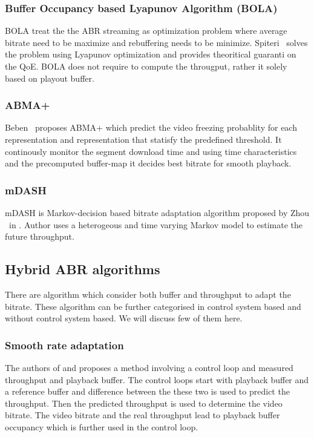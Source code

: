 \subsubsection{Buffer Occupancy based Lyapunov Algorithm (BOLA)\cite{7524428}}
BOLA\cite{7524428} treat the the ABR streaming as optimization problem where average bitrate need to be maximize and rebuffering needs to be minimize. Spiteri \etal\ solves the problem using Lyapunov optimization and provides theoritical guaranti on the QoE. BOLA does not require to compute the througput, rather it solely based on playout buffer.

\subsubsection{ABMA+\cite{10.1145/2910017.2910596}}
Beben \etal\ proposes ABMA+\cite{10.1145/2910017.2910596} which predict the video freezing probablity for each representation and representation that statisfy the predefined threshold. It continously monitor the segment download time and using time characteristics and the precomputed buffer-map it decides best bitrate for smooth playback.

\subsubsection{mDASH\cite{7393865}}
mDASH is Markov-decision based bitrate adaptation algorithm proposed by Zhou \etal\ in \cite{7393865}. Author uses a heterogeous and time varying Markov model to estimate the future throughput. 

\subsection{Hybrid ABR algorithms}
There are algorithm which consider both buffer and throughput to adapt the bitrate. These algorithm can be further categorised in control system based and without control system based. We will discuss few of them here.

\subsubsection{Smooth rate adaptation\cite{10.1145/2413176.2413190,6694183}}
The authors of \cite{10.1145/2413176.2413190} and \cite{6694183} proposes a method involving a control loop and measured throughput and playback buffer. The control loops start with playback buffer and a reference buffer and difference between the these two is used to predict the throughput. Then the predicted throughput is used to determine the video bitrate. The video bitrate and the real throughput lead to playback buffer occupancy which is further used in the control loop.

